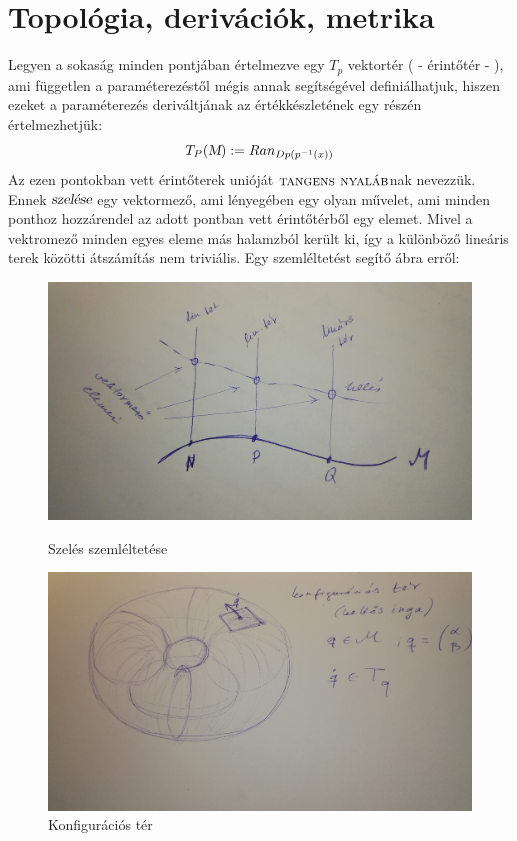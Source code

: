 \documentclass[a4paper,12pt]{article}
\begin{document}
\section{ Topológia, derivációk, metrika}
\par Legyen a sokaság minden pontjában értelmezve egy $T_{p}$ vektortér ( - érintőtér - ), ami független a paraméterezéstől mégis annak segítségével definiálhatjuk, hiszen ezeket a paraméterezés deriváltjának az értékkészletének egy részén értelmezhetjük:
\begin{equation}
T_{P}(\textsl{M}) := Ran_{Dp(p^{-1}(x))}
\end{equation}
Az ezen pontokban vett érintőterek unióját $\textsc{tangens nyaláb}$nak nevezzük. Ennek $\textsl{szelése}$ egy vektormező, ami lényegében egy olyan művelet, ami minden ponthoz hozzárendel az adott pontban vett érintőtérből egy elemet. Mivel a vektromező minden egyes eleme más halamzból került ki, így a különböző lineáris terek közötti átszámítás nem triviális. Egy szemléltetést segítő ábra erről:
\begin{figure}[H]
\centering
\begin{minipage}{0.46\linewidth}
\centering
\includegraphics[width=0.9\linewidth]{szeles.jpg}
\caption{Szelés szemléltetése}
\end{minipage}
\begin{minipage}{0.46\linewidth}
\centering
\includegraphics[width=0.9\linewidth]{konfi.jpg}
\caption{Konfigurációs tér}
\end{minipage}
\end{figure}
\end{document}
